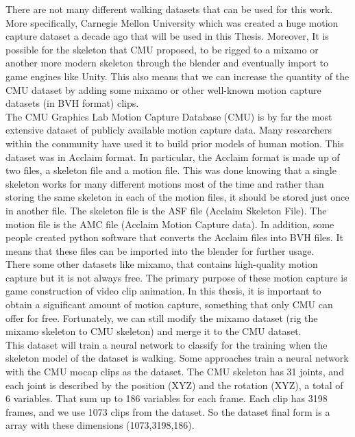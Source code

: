 There are not many different walking datasets that can be used for this work. More specifically, Carnegie Mellon University which was created a huge motion capture dataset a decade ago that will be used in this Thesis. Moreover, It is possible for the skeleton that CMU proposed, to be rigged to a mixamo or another more modern skeleton through the blender and eventually import to game engines like Unity. This also means that we can increase the quantity of the CMU dataset by adding some mixamo or other well-known motion capture datasets (in BVH format) clips.\\

The CMU Graphics Lab Motion Capture Database (CMU) is by far the most extensive dataset of publicly available motion capture data. Many researchers within the community have used it to build prior models of human motion. This dataset was in Acclaim format. In particular, the Acclaim format is made up of two files, a skeleton file and a motion file. This was done knowing that a single skeleton works for many different motions most of the time and rather than storing the same skeleton in each of the motion files, it should be stored just once in another file. The skeleton file is the ASF file (Acclaim Skeleton File). The motion file is the AMC file (Acclaim Motion Capture data). In addition, some people created python software that converts the Acclaim files into BVH files. It means that these files can be imported into the blender for further usage.\\

There some other datasets like mixamo, that contains high-quality motion capture but it is not always free. The primary purpose of these motion capture is game construction of video clip animation. In this thesis, it is important to obtain a significant amount of motion capture, something that only CMU can offer for free. Fortunately, we can still modify the mixamo dataset (rig the mixamo skeleton to CMU skeleton) and merge it to the CMU dataset.\\

This dataset will train a neural network to classify for the training when the skeleton model
of the dataset is walking. Some approaches train a neural network with the CMU mocap
clips as the dataset. The CMU skeleton has 31 joints, and each joint is described by the
position (XYZ) and the rotation (XYZ), a total of 6 variables. That sum up to 186 variables
for each frame. Each clip has 3198 frames, and we use 1073 clips from the dataset. So the
dataset final form is a array with  these dimensions (1073,3198,186).\\


